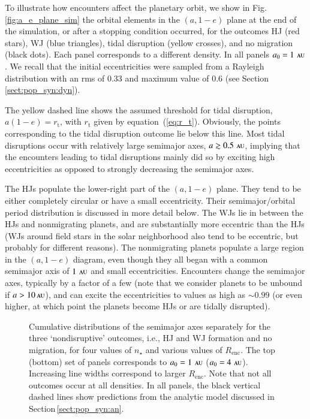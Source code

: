 \documentclass[iop,usenatbib]{emulateapj}
\renewcommand{\S}{Section}
\newcommand{\F}{Fig.}
\newcommand{\au}{\,\textsc{au}}
\newcommand{\renc}{R_\mathrm{enc}}
\begin{document}
To illustrate how encounters affect the planetary orbit, we show in \F\,\ref{fig:a_e_plane_sim} the orbital elements in the $(a,1-e)$ plane at the end of the simulation, or after a stopping condition occurred, for the outcomes HJ (red stars), WJ  (blue triangles), tidal disruption (yellow crosses), and no migration  (black dots). Each panel corresponds to a different density. In all panels $a_0=1\,\au$. We recall that the initial eccentricities were sampled from a Rayleigh distribution with an rms of 0.33 and maximum value of 0.6 (see \S\,\ref{sect:pop_syn:dyn}). 

The yellow dashed line shows the assumed threshold for tidal disruption, $a(1-e) = r_\mathrm{t}$, with $r_\mathrm{t}$ given by equation~(\ref{eq:r_t}). Obviously, the points corresponding to the tidal disruption outcome lie below this line. Most tidal disruptions occur with relatively large semimajor axes, $a \gtrsim 0.5\,\au$, implying that the encounters leading to tidal disruptions mainly did so by exciting high eccentricities as opposed to strongly decreasing the semimajor axes.

The HJs populate the lower-right part of the $(a,1-e)$ plane. They tend to be either completely circular or have a small eccentricity. Their semimajor/orbital period distribution is discussed in more detail below. The WJs lie in between the HJs and nonmigrating planets, and are substantially more eccentric than the HJs (WJs around field stars in the solar neighborhood also tend to be eccentric, but probably for different reasons). The nonmigrating planets populate a large region in the $(a,1-e)$ diagram, even though they all began with a common semimajor axis of $1\,\au$ and small eccentricities.  Encounters change the semimajor axes, typically by a factor of a few (note that we consider planets to be unbound if $a>10\au$), and can excite the eccentricities to values as high as $\sim 0.99$ (or even higher, at which point the planets become HJs or are tidally disrupted). 

\begin{figure}
\center
\iftoggle{ApJFigs}{
\texttt{[image: semimajor\_axes\_run05.eps]}
\texttt{[image: semimajor\_axes\_run05\_a4.eps]}
}{
\texttt{[image: figs/semimajor\_axes\_run05.eps]}
\texttt{[image: figs/semimajor\_axes\_run05\_a4.eps]}
}
\caption { Cumulative distributions of the semimajor axes separately for the three `nondisruptive' outcomes, i.e., HJ and WJ formation and no migration, for four values of $n_\star$ and various values of $\renc$. The top (bottom) set of panels corresponds to $a_0=1\,\au$ ($a_0=4\,\au$). Increasing line widths correspond to larger $\renc$. Note that not all outcomes occur at all densities. In all panels, the black vertical dashed lines show predictions from the analytic model discussed in \S\,\ref{sect:pop_syn:an}.}
\label{fig:HJ_smas}
\end{figure}
\end{document}
